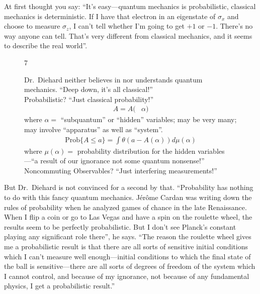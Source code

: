 \documentclass[12pt,nofootinbib]{revtex4}
\begin{document}
At first thought you say: ``It's easy---quantum mechanics is probabilistic, classical mechanics is deterministic. If I have that electron in an eigenstate of $\sigma_x$ and choose to measure $\sigma_z$, I can't tell whether I'm going to get $+1$ or $-1$. There's no way anyone can tell. That's very different from classical mechanics, and it seems to describe the real world''.
\begin{figure}[htb] 
\begin{mdframed}
  \vspace{5pt}\hfill 7\\ %
  \begin{raggedright}
    Dr.\ Diehard neither believes in nor understands quantum mechanics.  ``Deep down, it's all classical!''\\[\baselineskip]

    Probabilistic?  ``Just classical probability!''
    \begin{align}\nonumber
      A=A(&\alpha) %
    \end{align}
    where $\alpha =$ ``subquantum'' or ``hidden'' variables; 
    may be very many;
    may involve ``apparatus'' as well as ``system''.
    \begin{align}\nonumber
      \text{Prob}\{A\le a\}=\int \theta(a-A(\alpha)) d\mu(\alpha) 
    \end{align}
    where $\mu(\alpha) =$ probability distribution for the hidden variables---``a result of our ignorance not some quantum nonsense!'' \\[\baselineskip]

    Noncommuting Observables?  ``Just interfering measurements!''
  \end{raggedright}
  \vspace{6pt}
\end{mdframed}
\end{figure}

But Dr.\ Diehard is not convinced for a second by that. ``Probability has nothing to do with this fancy quantum mechanics. Jérôme Cardan was writing down the rules of probability when he analyzed games of chance in the late Renaissance. When I flip a coin or go to Las Vegas and have a spin on the roulette wheel, the results seem to be perfectly probabilistic. But I don't see Planck's constant playing any significant role there'', he says. ``The reason the roulette wheel gives me a probabilistic result is that there are all sorts of sensitive initial conditions which I can't measure well enough---initial conditions to which the final state of the ball is sensitive---there are all sorts of degrees of freedom of the system which I cannot control, and because of my ignorance, not because of any fundamental physics, I get a probabilistic
result.''
\end{document}
